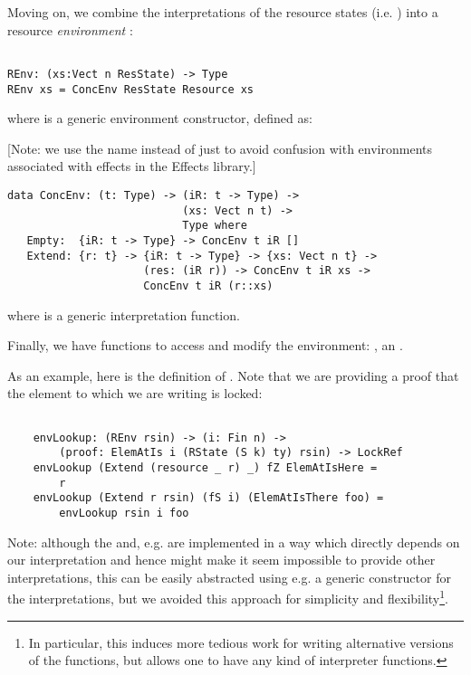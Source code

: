 Moving on, we combine the interpretations of the resource states (i.e.
) into a resource \emph{environment} :

\begin{BVerbatim}

REnv: (xs:Vect n ResState) -> Type
REnv xs = ConcEnv ResState Resource xs

\end{BVerbatim}

where  is a generic environment constructor, defined as:

[Note: we use the name  instead of just  to avoid
confusion with environments associated with effects in the Effects library.]

\begin{BVerbatim}
data ConcEnv: (t: Type) -> (iR: t -> Type) ->
                           (xs: Vect n t) ->
                           Type where
   Empty:  {iR: t -> Type} -> ConcEnv t iR []
   Extend: {r: t} -> {iR: t -> Type} -> {xs: Vect n t} ->
                     (res: (iR r)) -> ConcEnv t iR xs ->
                     ConcEnv t iR (r::xs)
\end{BVerbatim}

where  is a generic interpretation function.

Finally, we have functions to access and modify the environment:
,  an .

As an example, here is the definition of . Note that we are
providing a proof that the element to which we are writing is locked:

\begin{BVerbatim}

    envLookup: (REnv rsin) -> (i: Fin n) ->
        (proof: ElemAtIs i (RState (S k) ty) rsin) -> LockRef
    envLookup (Extend (resource _ r) _) fZ ElemAtIsHere =
        r
    envLookup (Extend r rsin) (fS i) (ElemAtIsThere foo) =
        envLookup rsin i foo

\end{BVerbatim}

Note: although the  and, e.g.  are implemented in a
way which directly depends on our  interpretation and hence
might make it seem impossible to provide other interpretations, this can be
easily abstracted using e.g. a generic constructor for the interpretations,
but we avoided this approach for simplicity and flexibility\footnote{
    In particular, this induces more tedious work for writing alternative versions
    of the  functions, but allows one to have any kind of interpreter
    functions.}.

